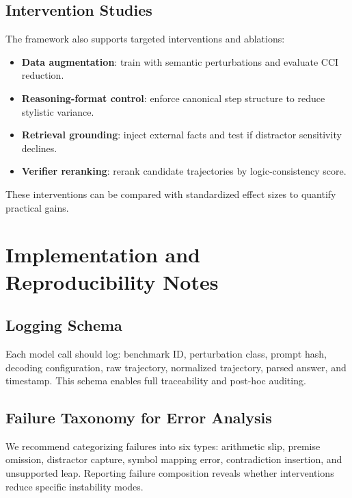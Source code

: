 \documentclass[conference]{IEEEtran}
\begin{document}
\subsection{Intervention Studies}
The framework also supports targeted interventions and ablations:
\begin{itemize}[leftmargin=*]
\item \textbf{Data augmentation}: train with semantic perturbations and evaluate CCI reduction.
\item \textbf{Reasoning-format control}: enforce canonical step structure to reduce stylistic variance.
\item \textbf{Retrieval grounding}: inject external facts and test if distractor sensitivity declines.
\item \textbf{Verifier reranking}: rerank candidate trajectories by logic-consistency score.
\end{itemize}
These interventions can be compared with standardized effect sizes to quantify practical gains.

\section{Implementation and Reproducibility Notes}
\subsection{Logging Schema}
Each model call should log: benchmark ID, perturbation class, prompt hash, decoding configuration, raw trajectory, normalized trajectory, parsed answer, and timestamp. This schema enables full traceability and post-hoc auditing.

\subsection{Failure Taxonomy for Error Analysis}
We recommend categorizing failures into six types: arithmetic slip, premise omission, distractor capture, symbol mapping error, contradiction insertion, and unsupported leap. Reporting failure composition reveals whether interventions reduce specific instability modes.
\end{document}
